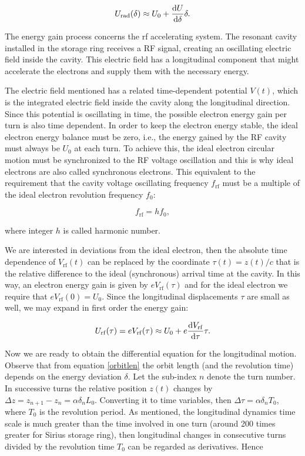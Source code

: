 \begin{equation}
    U_{\mathrm{rad}}(\delta) \approx U_0 + \dfrac{\mathrm{d} U}{\mathrm{d} \delta}\delta.
    \label{approx1}
\end{equation}

The energy gain process concerns the \gls{rf} accelerating system. The resonant cavity installed in the storage ring receives a RF signal, creating an oscillating electric field inside the cavity. This electric field has a longitudinal component that might accelerate the electrons and supply them with the necessary energy. 

The electric field mentioned has a related time-dependent potential $V(t)$, which is the integrated electric field inside the cavity along the longitudinal direction. Since this potential is oscillating in time, the possible electron energy gain per turn is also time dependent. In order to keep the electron energy stable, the ideal electron energy balance must be zero, i.e., the energy gained by the RF cavity must always be $U_0$ at each turn. To achieve this, the ideal electron circular motion must be synchronized to the RF voltage oscillation and this is why ideal electrons are also called synchronous electrons. This equivalent to the requirement that the cavity voltage oscillating frequency $f_{\mathrm{rf}}$ must be a multiple of the ideal electron revolution frequency $f_0$:

\begin{equation}
    f_{\mathrm{rf}} = h f_0,
\end{equation}

where integer $h$ is called harmonic number.

We are interested in deviations from the ideal electron, then the absolute time dependence of $V_{\mathrm{rf}}(t)$ can be replaced by the coordinate $\tau(t) = z(t)/c$ that is the relative difference to the ideal (synchronous) arrival time at the cavity. In this way, an electron energy gain is given by $eV_{\mathrm{rf}}(\tau)$ and for the ideal electron we require that $eV_{\mathrm{rf}}(0) = U_0$. Since the  longitudinal displacements $\tau$ are small as well, we may expand in first order the energy gain:

\begin{equation}
    U_{\mathrm{rf}}(\tau) = eV_{\mathrm{rf}}(\tau) \approx U_0 + e\dfrac{\mathrm{d} V_{\mathrm{rf}}}{\mathrm{d} \tau}\tau.
    \label{approx2}
\end{equation}

Now we are ready to obtain the differential equation for the longitudinal motion. Observe that from equation \eqref{orbitlen} the orbit length (and the revolution time) depends on the energy deviation $\delta$. Let the sub-index $n$ denote the turn number. In successive turns the relative position $z(t)$ changes by $\Delta z = z_{n+1} - z_n = \alpha\delta_n L_0$. Converting it to time variables, then $\Delta \tau = \alpha \delta_n T_0$, where $T_0$ is the revolution period. As mentioned, the longitudinal dynamics time scale is much greater than the time involved in one turn (around 200 times greater for Sirius storage ring), then longitudinal changes in consecutive turns divided by the revolution time $T_0$ can be regarded as derivatives. Hence

